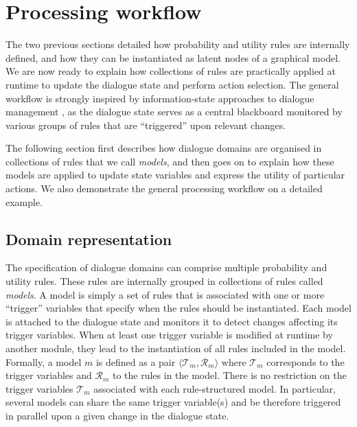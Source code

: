 
%

\section{Processing workflow}
\label{sec:processing-workflow}

The two previous sections detailed how probability and utility rules are internally defined, and how they can be instantiated as latent nodes of a graphical model. We are now ready to explain how collections of rules are practically applied at runtime to update the dialogue state and perform action selection. The general workflow is strongly inspired by information-state approaches to dialogue management \citep{Larsson:2000}, as the dialogue state serves as a central blackboard monitored by various groups of rules that are ``triggered'' upon relevant changes. 

The following section first describes how dialogue domains are organised in collections of rules that we call \textit{models}, and then goes on to explain how these models are applied to update state variables and express the utility of particular actions. We also demonstrate the general processing workflow on a detailed example. 


\subsection{Domain representation}

The specification of dialogue domains can comprise multiple probability and utility rules. These rules are internally grouped in collections of rules called \textit{models}. A model is simply a set of rules that is associated with one or more ``trigger'' variables that specify when the rules should be instantiated. Each model is attached to the dialogue state and monitors it to detect changes affecting its trigger variables. When at least one trigger variable is modified at runtime by another module, they lead to the instantiation of all rules included in the model. Formally, a model $m$ is defined as a pair $\langle \mathcal{T}_m, \mathcal{R}_m \rangle$ where $\mathcal{T}_m$ corresponds to the trigger variables and $\mathcal{R}_m$ to the rules in the model.  There is no restriction on the trigger variables $\mathcal{T}_m$ associated with each rule-structured model.  In particular, several models can share the same trigger variable(s) and be therefore triggered in parallel upon a given change in the dialogue state. 

